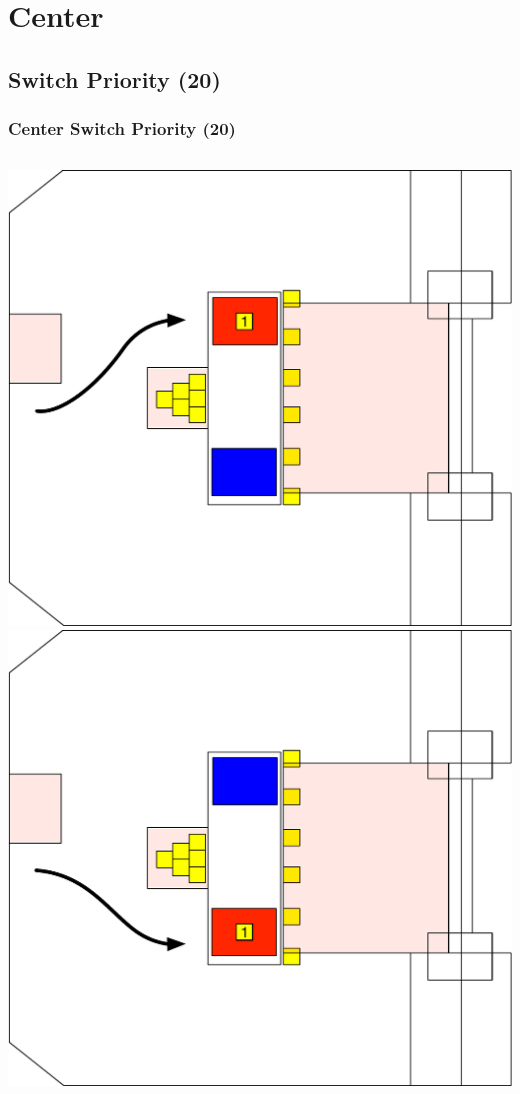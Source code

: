 \documentclass{beamer}
\begin{document}
\section{Center}
\subsection{Switch Priority (20)}

\begin{frame}
 \frametitle{Center Switch Priority \alert{(20)}}
 \begin{columns}
  \includegraphics[scale=0.25]{assets/paths/20_LX}
  \includegraphics[scale=0.25]{assets/paths/20_RX}
 \end{columns}
\end{frame}
\end{document}
